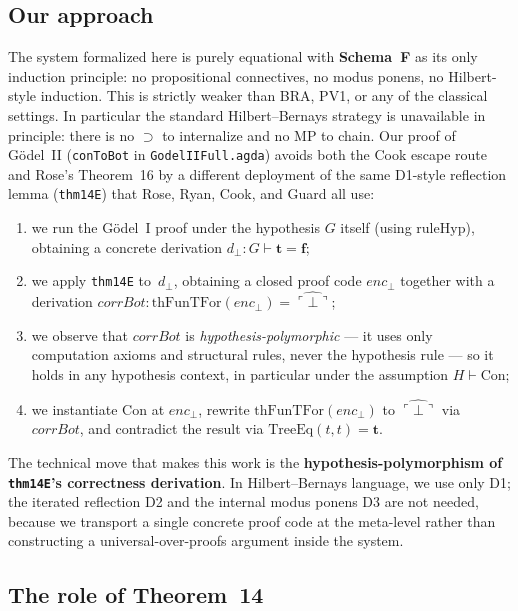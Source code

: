 \documentclass[11pt]{article}
\newcommand{\trueT}{\mathbf{t}}
\newcommand{\falseT}{\mathbf{f}}
\newcommand{\SchemaF}{\textbf{Schema~F}}
\newcommand{\code}[1]{\ulcorner #1 \urcorner}
\newcommand{\reify}[1]{\widehat{#1}}
\newcommand{\thFunTFor}{\mathrm{thFunTFor}}
\newcommand{\TreeEq}{\mathrm{TreeEq}}
\begin{document}
\subsection*{Our approach}

The system formalized here is purely equational with
\SchemaF{} as its only induction principle: no propositional
connectives, no modus ponens, no Hilbert-style induction.
This is strictly weaker than BRA, PV1, or any of the
classical settings.  In particular the standard
Hilbert--Bernays strategy is unavailable in principle:
there is no $\supset$ to internalize and no MP to chain.
Our proof of G\"odel~II (\texttt{conToBot} in
\texttt{GodelIIFull.agda}) avoids both the Cook escape route
and Rose's Theorem~16 by a different deployment of the same
D1-style reflection lemma (\texttt{thm14E}) that Rose, Ryan,
Cook, and Guard all use:

\begin{enumerate}
\item we run the G\"odel~I proof under the hypothesis $G$
  itself (using $\mathrm{ruleHyp}$), obtaining a concrete
  derivation $d_\bot : G \vdash \trueT = \falseT$;
\item we apply \texttt{thm14E} to~$d_\bot$, obtaining a
  closed proof code $\mathit{enc}_\bot$ together with a
  derivation $\mathit{corrBot} : \thFunTFor(\mathit{enc}_\bot)
  = \reify{\code{\bot}}$;
\item we observe that $\mathit{corrBot}$ is
  \emph{hypothesis-polymorphic} --- it uses only computation
  axioms and structural rules, never the hypothesis rule ---
  so it holds in any hypothesis context, in particular
  under the assumption $H \vdash \mathrm{Con}$;
\item we instantiate $\mathrm{Con}$ at $\mathit{enc}_\bot$,
  rewrite $\thFunTFor(\mathit{enc}_\bot)$ to
  $\reify{\code{\bot}}$ via $\mathit{corrBot}$, and contradict
  the result via $\TreeEq(t,t) = \trueT$.
\end{enumerate}

The technical move that makes this work is the
\textbf{hypothesis-polymorphism of \texttt{thm14E}'s
correctness derivation}.  In Hilbert--Bernays language,
we use only D1; the iterated reflection D2 and the internal
modus ponens D3 are not needed, because we transport a
single concrete proof code at the meta-level rather than
constructing a universal-over-proofs argument inside the
system.

\subsection*{The role of Theorem~14}
\end{document}
